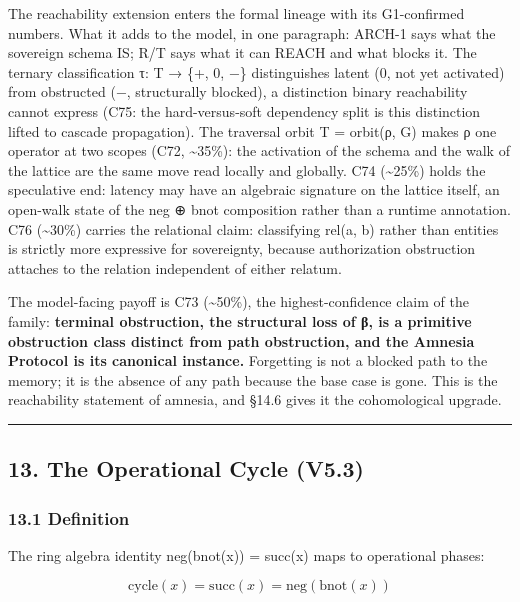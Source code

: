 \documentclass[
  11pt,
]{article}
\begin{document}
The reachability extension enters the formal lineage with its
G1-confirmed numbers. What it adds to the model, in one paragraph:
ARCH-1 says what the sovereign schema IS; R/T says what it can REACH and
what blocks it. The ternary classification τ: T → \{+, 0, −\}
distinguishes latent (0, not yet activated) from obstructed (−,
structurally blocked), a distinction binary reachability cannot express
(C75: the hard-versus-soft dependency split is this distinction lifted
to cascade propagation). The traversal orbit T = orbit(ρ, G) makes ρ one
operator at two scopes (C72, \textasciitilde35\%): the activation of the
schema and the walk of the lattice are the same move read locally and
globally. C74 (\textasciitilde25\%) holds the speculative end: latency
may have an algebraic signature on the lattice itself, an open-walk
state of the neg ⊕ bnot composition rather than a runtime annotation.
C76 (\textasciitilde30\%) carries the relational claim: classifying
rel(a, b) rather than entities is strictly more expressive for
sovereignty, because authorization obstruction attaches to the relation
independent of either relatum.

The model-facing payoff is C73 (\textasciitilde50\%), the
highest-confidence claim of the family: \textbf{terminal obstruction,
the structural loss of β, is a primitive obstruction class distinct from
path obstruction, and the Amnesia Protocol is its canonical instance.}
Forgetting is not a blocked path to the memory; it is the absence of any
path because the base case is gone. This is the reachability statement
of amnesia, and §14.6 gives it the cohomological upgrade.

\begin{center}\rule{0.5\linewidth}{0.5pt}\end{center}

\subsection{13. The Operational Cycle
(V5.3)}\label{the-operational-cycle-v5.3}

\subsubsection{13.1 Definition}\label{definition-4}

The ring algebra identity neg(bnot(x)) = succ(x) maps to operational
phases:

\[\text{cycle}(x) = \text{succ}(x) = \text{neg}(\text{bnot}(x))\]
\end{document}
